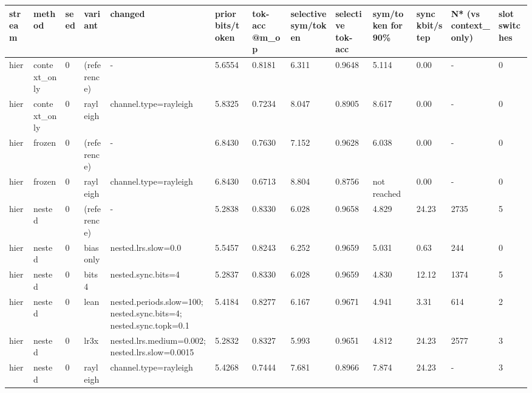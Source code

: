 \begin{tabular}{lllllllllllll}
\hline
stream & method & seed & variant & changed & prior bits/token & tok-acc @m\_op & selective sym/token & selective tok-acc & sym/token for 90\% & sync kbit/step & N* (vs context\_only) & slot switches \\
\hline
hier & context\_only & 0 & (reference) & - & 5.6554 & 0.8181 & 6.311 & 0.9648 & 5.114 & 0.00 & - & 0 \\
hier & context\_only & 0 & rayleigh & channel.type=rayleigh & 5.8325 & 0.7234 & 8.047 & 0.8905 & 8.617 & 0.00 & - & 0 \\
hier & frozen & 0 & (reference) & - & 6.8430 & 0.7630 & 7.152 & 0.9628 & 6.038 & 0.00 & - & 0 \\
hier & frozen & 0 & rayleigh & channel.type=rayleigh & 6.8430 & 0.6713 & 8.804 & 0.8756 & not reached & 0.00 & - & 0 \\
hier & nested & 0 & (reference) & - & 5.2838 & 0.8330 & 6.028 & 0.9658 & 4.829 & 24.23 & 2735 & 5 \\
hier & nested & 0 & biasonly & nested.lrs.slow=0.0 & 5.5457 & 0.8243 & 6.252 & 0.9659 & 5.031 & 0.63 & 244 & 0 \\
hier & nested & 0 & bits4 & nested.sync.bits=4 & 5.2837 & 0.8330 & 6.028 & 0.9659 & 4.830 & 12.12 & 1374 & 5 \\
hier & nested & 0 & lean & nested.periods.slow=100; nested.sync.bits=4; nested.sync.topk=0.1 & 5.4184 & 0.8277 & 6.167 & 0.9671 & 4.941 & 3.31 & 614 & 2 \\
hier & nested & 0 & lr3x & nested.lrs.medium=0.002; nested.lrs.slow=0.0015 & 5.2832 & 0.8327 & 5.993 & 0.9651 & 4.812 & 24.23 & 2577 & 3 \\
hier & nested & 0 & rayleigh & channel.type=rayleigh & 5.4268 & 0.7444 & 7.681 & 0.8966 & 7.874 & 24.23 & - & 3 \\
\hline
\end{tabular}
